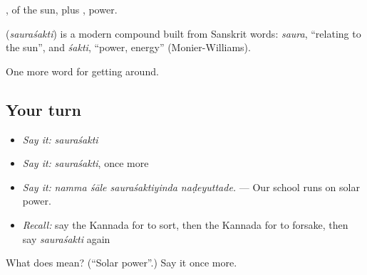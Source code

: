 , of the sun, plus , power.

\begin{cousinweb}
\textbf{} (\emph{sauraśakti}) is a modern compound built from Sanskrit words: \emph{saura}, \textquotedblleft{}relating to the sun\textquotedblright{}, and \emph{śakti}, \textquotedblleft{}power, energy\textquotedblright{} (Monier-Williams).
\end{cousinweb}

\begin{grammarlens}[title={What you've built}]
One more word for getting around.
\end{grammarlens}

\subsection*{Your turn}
\begin{itemize}
\raggedright
  \item \emph{Say it:} \emph{sauraśakti}
  \item \emph{Say it:} \emph{sauraśakti}, once more
  \item \emph{Say it:} \emph{namma śāle sauraśaktiyinda naḍeyuttade.} — Our school runs on solar power.
  \item \emph{Recall:} say the Kannada for to sort, then the Kannada for to forsake, then say \emph{sauraśakti} again
\end{itemize}

\begin{tcolorbox}[breakable,colback=teal!4,colframe=teal!35!black,title={Before you move on}]
What does  mean? (\textquotedblleft{}Solar power\textquotedblright{}.) Say it once more.
\end{tcolorbox}
